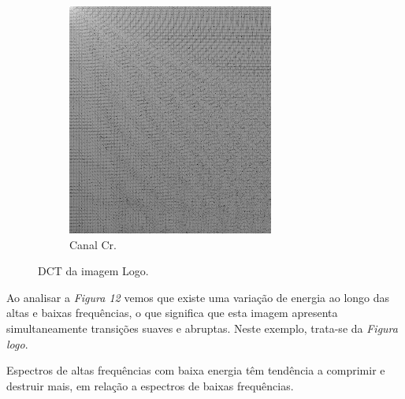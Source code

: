 \documentclass[a4paper, 12pt]{article}
\begin{document}
\begin{figure}[H]
\begin{subfigure}{0.3\textwidth}
                \centering
                \includegraphics[scale=0.5]{resources/DCT/CRdct_logo.png} 
                \caption{ Canal Cr.}
            \end{subfigure}
            \caption{ DCT da imagem Logo.}
            \label{fig:my_label}
        \end{figure}

        Ao analisar a \emph{Figura 12} vemos que existe uma variação de energia ao 
        longo das altas e baixas frequências, o que significa que esta imagem apresenta
        simultaneamente transições suaves e abruptas. Neste exemplo, trata-se da 
        \emph{Figura logo}.

        Espectros de altas frequências com baixa energia têm tendência a comprimir e destruir mais,
        em relação a espectros de baixas frequências.
\end{document}

